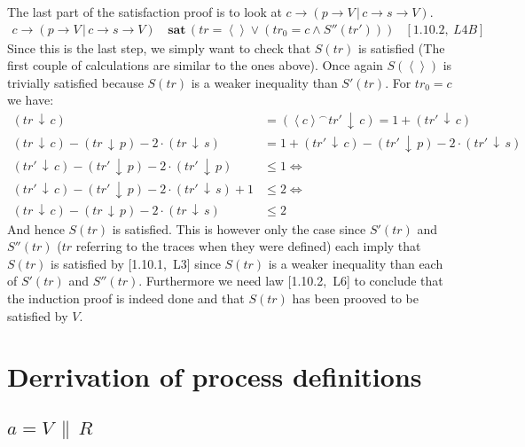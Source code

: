\documentclass[11pt,a4paper]{article}
\def\ra{\rightarrow}
\def\cc{\,\|\,}
\def\ch{\,|\,}
\def\cat{^{\frown}}
\def\count{\,\downarrow\,}
\def\sat{\,\textbf{sat}\,}
\newcommand{\ab}[1]{\left \langle #1 \right \rangle}
\begin{document}
The last part of the satisfaction proof is to look at $c \ra (p \ra V \ch c \ra
s \ra V)$.
\begin{align*}
    c \ra (p \ra V \ch c \ra s \ra V) &\sat (
        tr = \ab{ } \lor
        (tr_0 = c \land S''(tr'))
        ) & [1.10.2,~L4B]
\end{align*}
Since this is the last step, we simply want to check that $S(tr)$ is satisfied
(The first couple of calculations are similar to the ones above). Once again
$S(\ab{ })$ is trivially satisfied because $S(tr)$ is a weaker inequality than $S'(tr)$. For
$tr_0 = c$ we have:
\begin{align*}
    (tr \count c) &= (\ab{c} \cat tr' \count c) = 1 + (tr' \count c) \\
    (tr \count c) - (tr \count p) - 2 \cdot (tr \count s) &=
        1 + (tr' \count c) - (tr' \count p) - 2 \cdot (tr' \count s) \\
    (tr' \count c) - (tr' \count p) - 2 \cdot (tr' \count p) &\leq 1
    \Leftrightarrow \\
    (tr' \count c) - (tr' \count p) - 2 \cdot (tr' \count s) +1 & \leq 2
    \Leftrightarrow \\
    (tr \count c) - (tr \count p) - 2 \cdot (tr \count s) & \leq 2
\end{align*}
And hence $S(tr)$ is satisfied. This is however only the case since $S'(tr)$ and
$S''(tr)$ ($tr$ referring to the traces when they were defined) each imply that
$S(tr)$ is satisfied by [1.10.1,~L3] since $S(tr)$ is a weaker inequality than
each of $S'(tr)$ and $S''(tr)$. Furthermore we need law [1.10.2,~L6] to conclude that
the induction proof is indeed done and that $S(tr)$ has been prooved to be
satisfied by $V$.

\section{Derrivation of process definitions}
\subsection{$a = V \cc R$}
\end{document}
